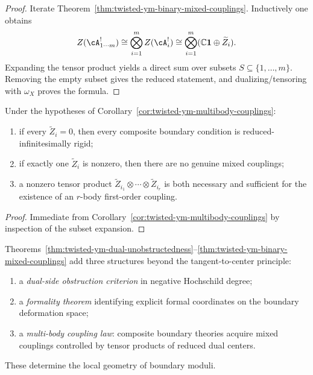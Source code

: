 \begin{proof}
Iterate Theorem~\ref{thm:twisted-ym-binary-mixed-couplings}. Inductively one obtains
\[
Z(\cA_{1\cdots m}^{!})
\cong
\bigotimes_{i=1}^m Z(\cA_i^{!})
\cong
\bigotimes_{i=1}^m (\mathbb{C}\mathbf{1}\oplus \widetilde Z_i).
\]
Expanding the tensor product yields a direct sum over subsets $S\subseteq \{1,\dots,m\}$. Removing the empty subset gives the reduced statement, and dualizing/tensoring with $\omega_X$ proves the formula.
\end{proof}

\begin{corollary}
\label{cor:twisted-ym-mixed-rigidity}
Under the hypotheses of Corollary~\ref{cor:twisted-ym-multibody-couplings}:
\begin{enumerate}[label=(\roman*)]
\item if every $\widetilde Z_i=0$, then every composite boundary condition is reduced-infinitesimally rigid;
\item if exactly one $\widetilde Z_i$ is nonzero, then there are no genuine mixed couplings;
\item a nonzero tensor product $\widetilde Z_{i_1}\otimes\cdots\otimes\widetilde Z_{i_r}$ is both necessary and sufficient for the existence of an $r$-body first-order coupling.
\end{enumerate}
\end{corollary}

\begin{proof}
Immediate from Corollary~\ref{cor:twisted-ym-multibody-couplings} by inspection of the subset expansion.
\end{proof}

\begin{remark}
\label{rem:twisted-ym-why-new}
Theorems~\ref{thm:twisted-ym-dual-unobstructedness}--\ref{thm:twisted-ym-binary-mixed-couplings} add three structures beyond the tangent-to-center principle:
\begin{enumerate}[label=(\roman*)]
\item a \emph{dual-side obstruction criterion} in negative Hochschild degree;
\item a \emph{formality theorem} identifying explicit formal coordinates on the boundary deformation space;
\item a \emph{multi-body coupling law}: composite boundary theories acquire mixed couplings controlled by tensor products of reduced dual centers.
\end{enumerate}
These determine the local geometry of boundary moduli.
\end{remark}
